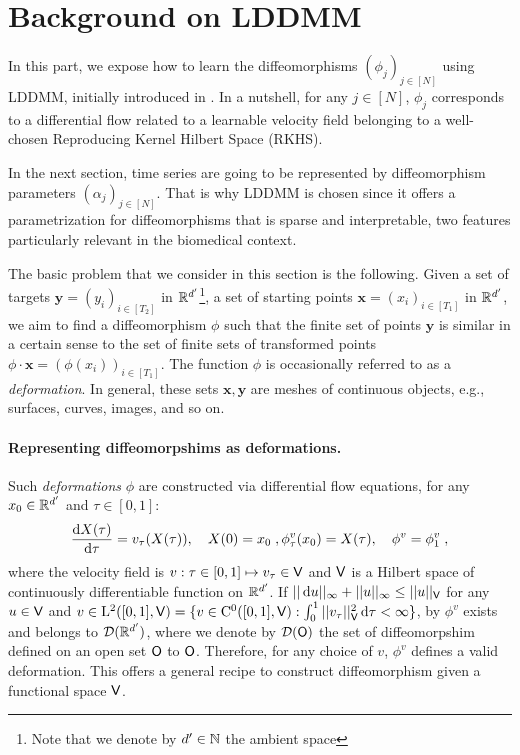 \vspace{-1ex}
\section{Background on LDDMM}
\vspace{-1ex}
\label{section:LDDMM}

In this part, we expose how to
 learn the diffeomorphisms $(\phi_j)_{j\in[N]}$ using LDDMM, initially introduced in \cite{beg2005computing}.
 In a nutshell, for any $j\in [N]$, $\phi_j$ corresponds to a differential flow related to a learnable velocity field belonging to a well-chosen Reproducing Kernel Hilbert Space (RKHS).

 In the next section, time series are going to be represented by diffeomorphism parameters $(\alpha_j)_{j\in[N]}$.
 That is why LDDMM is chosen since it offers a parametrization for diffeomorphisms that is sparse and interpretable, two features particularly relevant in the biomedical context.
 

The basic problem that we consider in this section is the following. Given a set of targets $\mathbf{y}=(y_i)_{i\in[T_2]}$ in $\mathbb{R}^{d'}$\footnote{Note that we denote by $d'\in\mathbb{N}$ the ambient space}, a set of starting points $\mathbf{x}=(x_{i})_{i\in[T_1]}$ in $\mathbb{R}^{d'}$, we aim to find a diffeomorphism $\phi$ such that the finite set of points $\mathbf{y}$ is similar in a certain sense to the set of finite sets of transformed points $\phi \cdot \mathbf{x} =(\phi(x_i))_{i\in[T_1]} $.
 The function $\phi$ is occasionally referred to as a \textit{deformation}. In general, these sets $\mathbf{x},\mathbf{y}$ are meshes of continuous objects, e.g., surfaces, curves, images, and so on.

 \vspace{-1ex}
\paragraph{Representing diffeomorpshims as deformations.}
Such \textit{deformations} $\phi$ are constructed via differential flow equations, for any $x_0\in \mathbb{R}^{d'} $ and $\tau\in[0,1]$:
\begin{equation}
  \label{eq:LDDMM_dynamic}
    \frac{\mathop{}\!\mathrm{d} X(\tau)}{\mathop{}\!\mathrm{d} \tau}= v_\tau(X(\tau)), \quad X(0)=x_0\; ,
    \phi^v_\tau(x_0)=X(\tau), \quad \phi^v=\phi^v_1  \; ,
\end{equation}
where the velocity field is $v:\tau\in [0,1]\mapsto v_\tau\in \mathsf{V} $
and $\mathsf{V}$ is a Hilbert space of continuously differentiable function
on $\mathbb{R}^{d'}$.  If
$||\mathop{}\!\mathrm{d} u ||_{\infty}+|| u ||_{\infty}\leq ||u ||_{\mathsf{V}} $ for any
$u\in \mathsf{V}$ and
$v\in \mathrm{L}^2([0,1],\mathsf{V})=\{v\in \mathrm{C}^0([0,1],\mathsf{V}): \int_0^1 ||
v_\tau||^2_{\mathsf{V}} \mathop{}\!\mathrm{d} \tau<\infty \} $, by \citep[Theorem 5]{glaunes2005transport}
$\phi^v$ exists and belongs to $\mathcal{D}(\mathbb{R}^{d'})$, where we denote by $\mathcal{D}(\mathsf{O}) $ the set of diffeomorpshim defined on an open set $\mathsf{O}$ to $\mathsf{O}$.
 Therefore, for any choice of $v$, $\phi^v$ defines a valid deformation. 
This offers a general recipe to construct diffeomorphism given a functional space $\mathsf{V}$.

